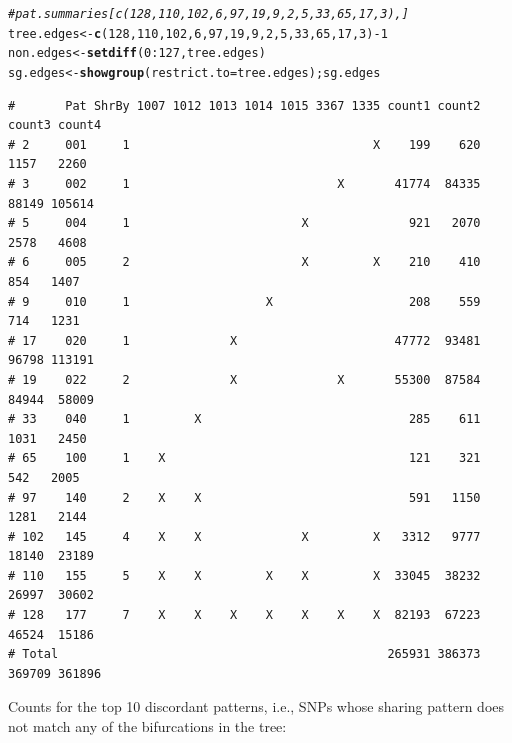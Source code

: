\documentclass{article}\usepackage[]{graphicx}\usepackage[]{color}
\makeatletter
\newcommand{\hlnum}[1]{\textcolor[rgb]{0.686,0.059,0.569}{#1}}%
\newcommand{\hlcom}[1]{\textcolor[rgb]{0.678,0.584,0.686}{\textit{#1}}}%
\newcommand{\hlopt}[1]{\textcolor[rgb]{0,0,0}{#1}}%
\newcommand{\hlstd}[1]{\textcolor[rgb]{0.345,0.345,0.345}{#1}}%
\newcommand{\hlkwb}[1]{\textcolor[rgb]{0.69,0.353,0.396}{#1}}%
\newcommand{\hlkwc}[1]{\textcolor[rgb]{0.333,0.667,0.333}{#1}}%
\newcommand{\hlkwd}[1]{\textcolor[rgb]{0.737,0.353,0.396}{\textbf{#1}}}%
\newenvironment{kframe}{%
 \def\at@end@of@kframe{}%
 \ifinner\ifhmode%
  \def\at@end@of@kframe{\end{minipage}}%
  \begin{minipage}{\columnwidth}%
 \fi\fi%
 \def\FrameCommand##1{\hskip\@totalleftmargin \hskip-\fboxsep
 \colorbox{shadecolor}{##1}\hskip-\fboxsep
     \hskip-\linewidth \hskip-\@totalleftmargin \hskip\columnwidth}%
 \MakeFramed {\advance\hsize-\width
   \@totalleftmargin\z@ \linewidth\hsize
   \@setminipage}}%
 {\par\unskip\endMakeFramed%
 \at@end@of@kframe}
\newenvironment{knitrout}{}{} %
\makeatother
\begin{document}
\begin{knitrout}\scriptsize
{}\color{fgcolor}\begin{kframe}
\begin{alltt}
\hlcom{#pat.summaries[c(128,110,102,6,97,19,9,2,5,33,65,17,3),]}
\hlstd{tree.edges} \hlkwb{<-} \hlkwd{c}\hlstd{(}\hlnum{128}\hlstd{,}\hlnum{110}\hlstd{,}\hlnum{102}\hlstd{,}\hlnum{6}\hlstd{,}\hlnum{97}\hlstd{,}\hlnum{19}\hlstd{,}\hlnum{9}\hlstd{,}\hlnum{2}\hlstd{,}\hlnum{5}\hlstd{,}\hlnum{33}\hlstd{,}\hlnum{65}\hlstd{,}\hlnum{17}\hlstd{,}\hlnum{3}\hlstd{)}\hlopt{-}\hlnum{1}
\hlstd{non.edges} \hlkwb{<-} \hlkwd{setdiff}\hlstd{(}\hlnum{0}\hlopt{:}\hlnum{127}\hlstd{, tree.edges)}
\hlstd{sg.edges} \hlkwb{<-} \hlkwd{showgroup}\hlstd{(}\hlkwc{restrict.to}\hlstd{=tree.edges) ; sg.edges}
\end{alltt}
\begin{verbatim}
#       Pat ShrBy 1007 1012 1013 1014 1015 3367 1335 count1 count2 count3 count4
# 2     001     1                                  X    199    620   1157   2260
# 3     002     1                             X       41774  84335  88149 105614
# 5     004     1                        X              921   2070   2578   4608
# 6     005     2                        X         X    210    410    854   1407
# 9     010     1                   X                   208    559    714   1231
# 17    020     1              X                      47772  93481  96798 113191
# 19    022     2              X              X       55300  87584  84944  58009
# 33    040     1         X                             285    611   1031   2450
# 65    100     1    X                                  121    321    542   2005
# 97    140     2    X    X                             591   1150   1281   2144
# 102   145     4    X    X              X         X   3312   9777  18140  23189
# 110   155     5    X    X         X    X         X  33045  38232  26997  30602
# 128   177     7    X    X    X    X    X    X    X  82193  67223  46524  15186
# Total                                              265931 386373 369709 361896
\end{verbatim}
\end{kframe}
\end{knitrout}

Counts for the top 10 discordant patterns, i.e., SNPs whose sharing pattern does not match any of the bifurcations in the tree:
\end{document}
